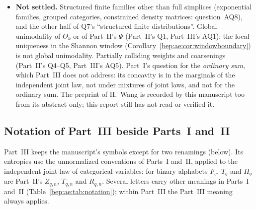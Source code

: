 \documentclass[11pt]{article}
\numberwithin{equation}{section}
\theoremstyle{definition}
\theoremstyle{remark}
\begin{document}
\begin{itemize}
of Part~II's $N(q)\sim2/q$ (Theorem~\ref{bep:pe:thm:smallq}). The binary
statements of Proposition~\ref{bep:ae:prop:remaining} are Part~II's
Theorems~\ref{bep:pe:thm:renyi} and~\ref{bep:pe:thm:tsallisabove}; the
manuscript itself calls these recovered, not new.
\item \textbf{Not settled.} Structured finite families other than full
simplices (exponential families, grouped categories, constrained
density matrices: question~AQ8), and the other half of Q7's
``structured finite distributions''. Global unimodality of $\Theta_k$ or
of Part~II's $\Psi$ (Part~II's Q1, Part~III's AQ1): the local uniqueness
in the Shannon window (Corollary~\ref{bep:ae:cor:windowboundary}) is not
global unimodality. Partially colliding weights and coarsenings
(Part~II's Q4--Q5, Part~III's AQ5). Part~I's question for the
\emph{ordinary sum}, which Part~III does not address: its concavity is in
the marginals of the independent joint law, not under mixtures of joint
laws, and not for the ordinary sum. The preprint of H.~Wang
\cite{bep:pe:Wang} is recorded by this manuscript too from its abstract
only; this report still has not read or verified it.
\end{itemize}

\subsection{Notation of Part~III beside Parts~I and~II}\label{bep:ae:sec:notation}
Part~III keeps the manuscript's symbols except for two renamings (below).
Its entropies use the unnormalized conventions of Parts~I and~II, applied
to the independent joint law of categorical variables: for binary
alphabets $F_q$, $T_q$ and $H_q$ are Part~II's $Z_{q,n}$, $T_{q,n}$ and
$R_{q,n}$. Several letters carry other meanings in Parts~I and~II
(Table~\ref{bep:ae:tab:notation}); within Part~III the Part~III meaning
always applies.
\end{document}
